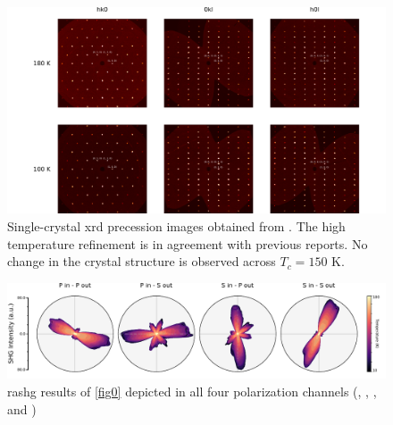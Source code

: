 \begin{figure}
\centering
\includegraphics[width=\textwidth]{./gfx/ch6/xrd.pdf}
\captionsetup{singlelinecheck=off}
\caption[]{
\label{xrd}
Single-crystal \gls{xrd} precession images obtained from \cmb.
The high temperature refinement is in agreement with previous reports\citep{gibson_magnetic_2015}.
No change in the crystal structure is observed across $T_c=150$ \si{K}.
}
\end{figure}

\begin{figure}
\centering
\includegraphics[width=\textwidth]{./gfx/ch6/full_fig0.pdf}
\caption{\label{fulltempdep}\gls{rashg} results of \cref{fig0} depicted in all four polarization channels (\PP, \PS, \SP, and \SS)}
\end{figure}


